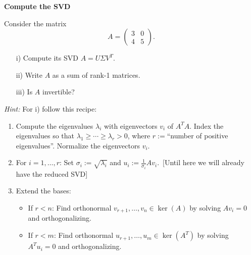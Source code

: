 \textbf{\normalsize Compute the SVD}

	Consider the matrix
	$$A = \begin{pmatrix}
	3 &0\\4&5
	\end{pmatrix}.$$
	\begin{itemize}
		\item[i)] Compute its SVD $A = U\Sigma V^T$.
		\item[ii)] Write $A$ as a sum of rank-1 matrices.
		\item[iii)] Is $A$ invertible?
	\end{itemize}

\textit{Hint:} For i) follow this recipe:
\begin{enumerate}
	\color{navy}
	\item Compute the eigenvalues $\lambda_i$ with eigenvectors $v_i$ of $A^TA$. Index the eigenvalues so that $\lambda_1 \geq \cdots \geq \lambda_r > 0$, where $r := $``number of positive eigenvalues''. Normalize the eigenvectors $v_i$. 
	\vspace{-0.2cm}\item For $i =1,\ldots, r$: Set $\sigma_i := \sqrt{\lambda_i}$ and $u_i := \frac{1}{\sigma_i} Av_i$.~[Until here we will already have the reduced SVD]
		\vspace{-0.2cm}\item Extend the bases: 
		\vspace{-0.2cm}\begin{itemize}
\item If $r < n$: Find orthonormal $v_{r+1}, \ldots, v_n \in \ker(A)$ by solving $A v_i = 0$ and orthogonalizing.
	\vspace{-0.2cm}\item If $r < m$: Find orthonormal $u_{r+1}, \ldots, u_m \in \ker(A^T)$ by solving $A^Tu_i = 0$ and orthogonalizing.
				  
\end{itemize}
\end{enumerate}
